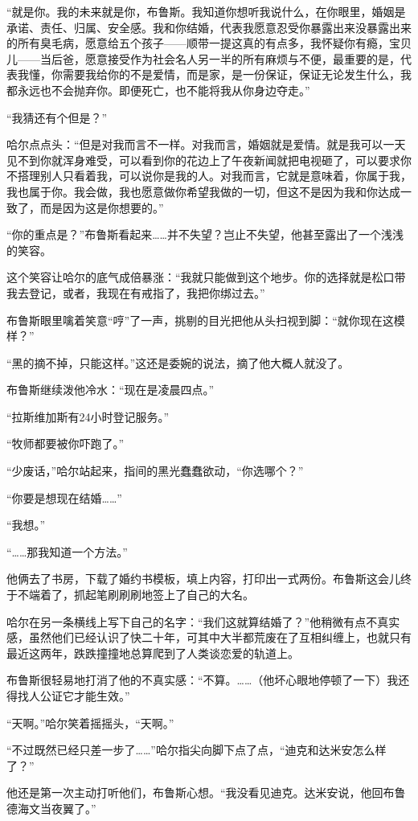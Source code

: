 \documentclass[../main]{subfiles}
\begin{document}
“就是你。我的未来就是你，布鲁斯。我知道你想听我说什么，在你眼里，婚姻是承诺、责任、归属、安全感。我和你结婚，代表我愿意忍受你暴露出来没暴露出来的所有臭毛病，愿意给五个孩子——顺带一提这真的有点多，我怀疑你有瘾，宝贝儿——当后爸，愿意接受作为社会名人另一半的所有麻烦与不便，最重要的是，代表我懂，你需要我给你的不是爱情，而是家，是一份保证，保证无论发生什么，我都永远也不会抛弃你。即便死亡，也不能将我从你身边夺走。”

“我猜还有个但是？”

哈尔点点头：“但是对我而言不一样。对我而言，婚姻就是爱情。就是我可以一天见不到你就浑身难受，可以看到你的花边上了午夜新闻就把电视砸了，可以要求你不搭理别人只看着我，可以说你是我的人。对我而言，它就是意味着，你属于我，我也属于你。我会做，我也愿意做你希望我做的一切，但这不是因为我和你达成一致了，而是因为这是你想要的。”

“你的重点是？”布鲁斯看起来……并不失望？岂止不失望，他甚至露出了一个浅浅的笑容。

这个笑容让哈尔的底气成倍暴涨：“我就只能做到这个地步。你的选择就是松口带我去登记，或者，我现在有戒指了，我把你绑过去。”

布鲁斯眼里噙着笑意“哼”了一声，挑剔的目光把他从头扫视到脚：“就你现在这模样？”

“黑的摘不掉，只能这样。”这还是委婉的说法，摘了他大概人就没了。

布鲁斯继续泼他冷水：“现在是凌晨四点。”

“拉斯维加斯有24小时登记服务。”

“牧师都要被你吓跑了。”

“少废话，”哈尔站起来，指间的黑光蠢蠢欲动，“你选哪个？”

“你要是想现在结婚……”

“我想。”

“……那我知道一个方法。”

他俩去了书房，下载了婚约书模板，填上内容，打印出一式两份。布鲁斯这会儿终于不端着了，抓起笔刷刷刷地签上了自己的大名。

哈尔在另一条横线上写下自己的名字：“我们这就算结婚了？”他稍微有点不真实感，虽然他们已经认识了快二十年，可其中大半都荒废在了互相纠缠上，也就只有最近这两年，跌跌撞撞地总算爬到了人类谈恋爱的轨道上。

布鲁斯很轻易地打消了他的不真实感：“不算。……（他坏心眼地停顿了一下）我还得找人公证它才能生效。”

“天啊。”哈尔笑着摇摇头，“天啊。”

“不过既然已经只差一步了……”哈尔指尖向脚下点了点，“迪克和达米安怎么样了？”

他还是第一次主动打听他们，布鲁斯心想。“我没看见迪克。达米安说，他回布鲁德海文当夜翼了。”
\end{document}
